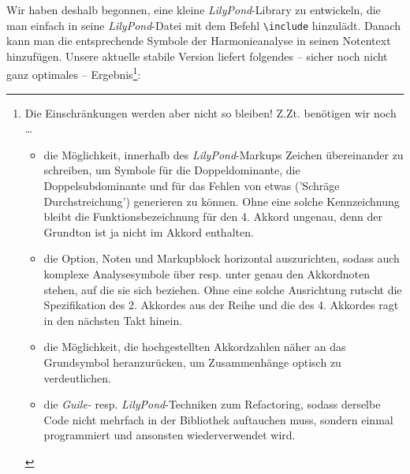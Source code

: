 \label{LilyPondFuncTheory}Wir haben deshalb begonnen, eine kleine
\textit{LilyPond}-Library zu entwickeln, die man einfach in seine
\textit{LilyPond}-Datei mit dem Befehl \texttt{\textbackslash{include}}
hinzulädt. Danach kann man die entsprechende Symbole der Harmonieanalyse in
seinen Notentext hinzufügen. Unsere aktuelle stabile Version liefert folgendes
-- sicher noch nicht ganz optimales -- Ergebnis\footnote{Die Einschränkungen
werden aber nicht so bleiben! Z.Zt.
benötigen wir noch \ldots
\begin{itemize}
  \item die Möglichkeit, innerhalb des \textit{LilyPond}-Markups Zeichen
  übereinander zu schreiben, um Symbole für die Doppeldominante, die
  Doppelsubdominante und für das Fehlen von etwas ('Schräge Durchstreichung')
  generieren zu können. Ohne eine solche Kennzeichnung bleibt die
  Funktionsbezeichnung für den 4. Akkord ungenau, denn der Grundton ist ja nicht
  im Akkord enthalten.
  \item die Option, Noten und Markupblock horizontal auszurichten, sodass auch
  komplexe Analysesymbole über resp. unter genau den Akkordnoten stehen, auf die
  sie sich beziehen. Ohne eine solche Ausrichtung rutscht die Spezifikation des
  2. Akkordes aus der Reihe und die des 4. Akkordes ragt in den nächsten Takt
  hinein.
  \item die Möglichkeit, die hochgestellten Akkordzahlen näher an das
  Grundsymbol heranzurücken, um Zusammenhänge optisch zu verdeutlichen.
  \item die \textit{Guile-} resp. \textit{LilyPond}-Techniken zum Refactoring,
  sodass derselbe Code nicht mehrfach in der Bibliothek auftauchen muss, sondern
  einmal programmiert und ansonsten wiederverwendet wird.
\end{itemize}}:


